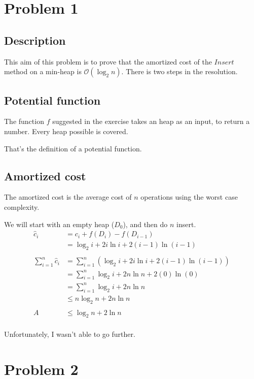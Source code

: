 \section{Problem 1}
    \subsection{Description}
        This aim of this problem is to prove that the amortized cost of the $Insert$ method on a min-heap is $\mathcal{O}(\log_2n)$. There is two steps in the resolution.

    \subsection{Potential function}
        The function $f$ suggested in the exercise takes an heap as an input, to return a number. Every heap possible is covered.

        That's the definition of a potential function.

    \subsection{Amortized cost}
        The amortized cost is the average cost of $n$ operations using the worst case complexity.

        We will start with an empty heap ($D_0$), and then do $n$ insert.
        \begin{align}
        \hat{c}_i &= c_i + f(D_i) - f(D_{i-1})\\\nonumber
            &= \log_2i + 2i\ln i + 2(i-1)\ln(i-1)\\\nonumber
            \\\nonumber
        \sum_{i=1}^{n} \hat{c}_i &= \sum_{i=1}^{n}(\log_2i + 2i\ln i + 2(i-1)\ln(i-1))\\\nonumber
            &= \sum_{i=1}^{n}\log_2i + 2n\ln n + 2(0)\ln(0)\\\nonumber
            &= \sum_{i=1}^{n}\log_2i + 2n\ln n\\\nonumber
            &\leq n\log_2n + 2n\ln n\\\nonumber
            \\\nonumber
        A &\leq \log_2n + 2\ln n\\\nonumber 
        \end{align}

        Unfortunately, I wasn't able to go further.   



\section{Problem 2}
